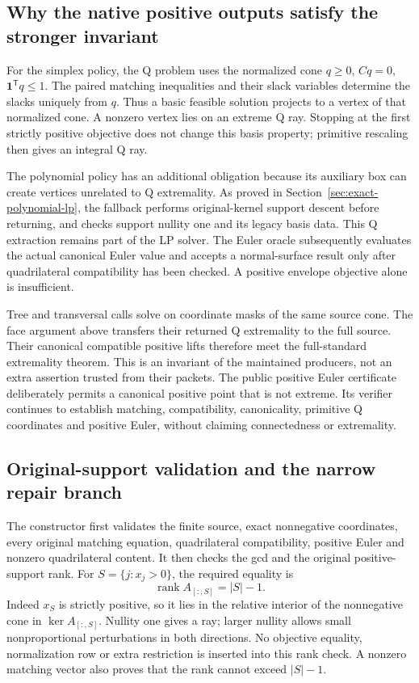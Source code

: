 \subsection{Why the native positive outputs satisfy the stronger invariant}

For the simplex policy, the Q problem uses the normalized cone
$q\ge0$, $Cq=0$, $\mathbf1^{\mathsf T}q\le1$.  The paired matching
inequalities and their slack variables determine the slacks uniquely from
$q$.  Thus a basic feasible solution projects to a vertex of that
normalized cone.  A nonzero vertex lies on an extreme Q ray.  Stopping at
the first strictly positive objective does not change this basis property;
primitive rescaling then gives an integral Q ray.

The polynomial policy has an additional obligation because its auxiliary
box can create vertices unrelated to Q extremality.  As proved in
Section~\ref{sec:exact-polynomial-lp}, the fallback performs original-kernel
support descent before returning, and checks support nullity one and its
legacy basis data.  This Q extraction remains part of the LP solver.
The Euler oracle subsequently evaluates the actual canonical Euler value
and accepts a normal-surface result only after quadrilateral compatibility
has been checked.  A positive envelope objective alone is insufficient.

Tree and transversal calls solve on coordinate masks of the same source
cone.  The face argument above transfers their returned Q extremality to
the full source.  Their canonical compatible positive lifts therefore
meet the full-standard extremality theorem.  This is an invariant of the
maintained producers, not an extra assertion trusted from their packets.
The public positive Euler certificate deliberately permits a canonical
positive point that is not extreme.  Its verifier continues to establish
matching, compatibility, canonicality, primitive Q coordinates and
positive Euler, without claiming connectedness or extremality.

\subsection{Original-support validation and the narrow repair branch}

The constructor  first validates the finite source,
exact nonnegative coordinates, every original matching equation,
quadrilateral compatibility, positive Euler and nonzero quadrilateral
content.  It then checks the gcd and the original positive-support rank.
For $S=\{j:x_j>0\}$, the required equality is
\[
 \operatorname{rank}A_{[:,S]}=|S|-1.
\]
Indeed $x_S$ is strictly positive, so it lies in the relative interior of
the nonnegative cone in $\ker A_{[:,S]}$.  Nullity one gives a ray; larger
nullity allows small nonproportional perturbations in both directions.
No objective equality, normalization row or extra restriction is inserted
into this rank check.  A nonzero matching vector also proves that the rank
cannot exceed $|S|-1$.

